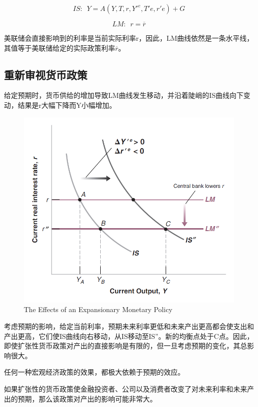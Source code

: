 \documentclass{article}
\begin{document}
\[
IS:\enspace Y=A(Y,T,r,Y'^e,T'e,r'e)+G
\]

\[
LM:\enspace r=\overline{r}
\]

美联储会直接影响到的利率是当前实际利率r，因此，LM曲线依然是一条水平线，其值等于美联储给定的实际政策利率$ \overline{r} $。

\subsection{重新审视货币政策}

给定预期时，货币供给的增加导致LM曲线发生移动，并沿着陡峭的IS曲线向下变动，结果是r大幅下降而Y小幅增加。

\begin{figure}[H] %
	\centering %
	\includegraphics[width=1\textwidth]{16_4} %
	\caption{The Effects of an
		Expansionary Monetary
		Policy} %
	\label{Fig.main5} %
\end{figure}

考虑预期的影响，给定当前利率，预期未来利率更低和未来产出更高都会使支出和产出更高，它们使IS曲线向右移动，从IS移动至IS''。新的均衡点处于C点。因此，即使扩张性货币政策对产出的直接影响是有限的，但一旦考虑预期的变化，其总影响很大。

任何一种宏观经济政策的效果，都极大依赖于预期的效应。

如果扩张性的货币政策使金融投资者、公司以及消费者改变了对未来利率和未来产出的预期，那么该政策对产出的影响可能非常大。
\end{document}
